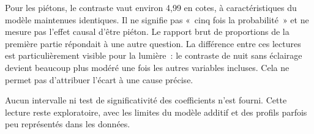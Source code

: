 Pour les piétons, le contraste vaut environ 4,99 en cotes, à caractéristiques du modèle
maintenues identiques. Il ne signifie pas «~cinq fois la probabilité~» et ne mesure
pas l'effet causal d'être piéton. Le rapport brut de proportions de la première partie
répondait à une autre question. La différence entre ces lectures est particulièrement
visible pour la lumière~: le contraste de nuit sans éclairage devient beaucoup plus
modéré une fois les autres variables incluses. Cela ne permet pas d'attribuer l'écart
à une cause précise.

Aucun intervalle ni test de significativité des coefficients n'est fourni. Cette
lecture reste exploratoire, avec les limites du modèle additif et des profils parfois
peu représentés dans les données.

\FloatBarrier
{}
